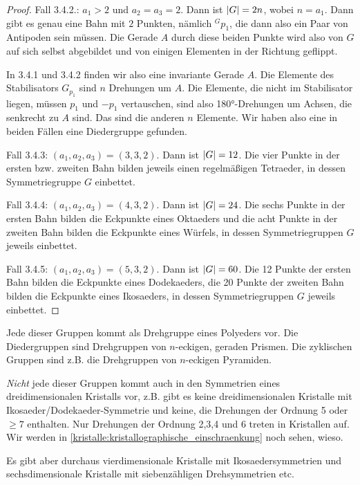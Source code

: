 \begin{proof}
Fall 3.4.2.: $a_1>2$ und $a_2=a_3=2$. Dann ist $\lvert G\rvert=2n$, wobei $n=a_1$. Dann gibt es genau eine Bahn mit $2$ Punkten, nämlich ${^Gp_1}$, die dann also ein Paar von Antipoden sein müssen. Die Gerade $A$ durch diese beiden Punkte wird also von $G$ auf sich selbst abgebildet und von einigen Elementen in der Richtung geflippt.

In 3.4.1 und 3.4.2 finden wir also eine invariante Gerade $A$. Die Elemente des Stabilisators $G_{p_1}$ sind $n$ Drehungen um $A$. Die Elemente, die nicht im Stabilisator liegen, müssen $p_1$ und $-p_1$ vertauschen, sind also 180°-Drehungen um Achsen, die senkrecht zu $A$ sind. Das sind die anderen $n$ Elemente. Wir haben also eine in beiden Fällen eine Diedergruppe gefunden.

Fall 3.4.3: $(a_1,a_2,a_3)=(3,3,2)$. Dann ist $\lvert G\rvert=12$. Die vier Punkte in der ersten bzw. zweiten Bahn bilden jeweils einen regelmäßigen Tetraeder, in dessen Symmetriegruppe $G$ einbettet.

Fall 3.4.4: $(a_1,a_2,a_3)=(4,3,2)$. Dann ist $\lvert G\rvert=24$. Die sechs Punkte in der ersten Bahn bilden die Eckpunkte eines Oktaeders und die acht Punkte in der zweiten Bahn bilden die Eckpunkte eines Würfels, in dessen Symmetriegruppen $G$ jeweils einbettet.

Fall 3.4.5: $(a_1,a_2,a_3)=(5,3,2)$. Dann ist $\lvert G\rvert=60$. Die 12 Punkte der ersten Bahn bilden die Eckpunkte eines Dodekaeders, die 20 Punkte der zweiten Bahn bilden die Eckpunkte eines Ikosaeders, in dessen Symmetriegruppen $G$ jeweils einbettet.
\end{proof}

\begin{remark}
Jede dieser Gruppen kommt als Drehgruppe eines Polyeders vor. Die Diedergruppen sind Drehgruppen von $n$-eckigen, geraden Prismen. Die zyklischen Gruppen sind z.B. die Drehgruppen von $n$-eckigen Pyramiden.
\end{remark}

\begin{remark}
\emph{Nicht} jede dieser Gruppen kommt auch in den Symmetrien eines dreidimensionalen Kristalls vor, z.B. gibt es keine dreidimensionalen Kristalle mit Ikosaeder/Dodekaeder-Symmetrie und keine, die Drehungen der Ordnung 5 oder $\geq 7$ enthalten. Nur Drehungen der Ordnung 2,3,4 und 6 treten in Kristallen auf. Wir werden in \ref{kristalle:kristallographische_einschraenkung} noch sehen, wieso.

Es gibt aber durchaus vierdimensionale Kristalle mit Ikosaedersymmetrien und sechsdimensionale Kristalle mit siebenzähligen Drehsymmetrien etc.
\end{remark}